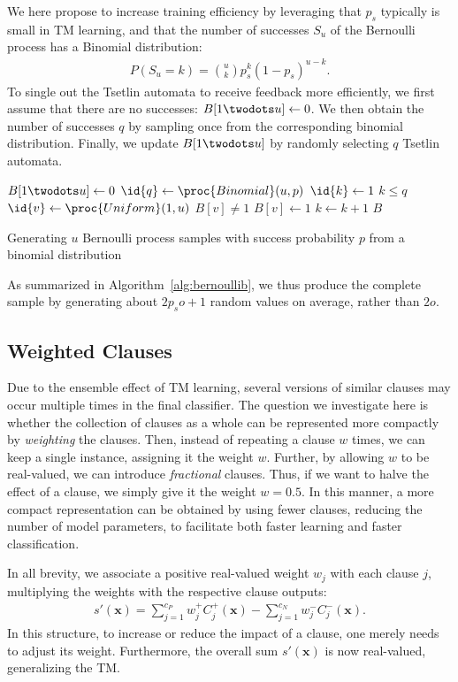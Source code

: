 \documentclass[letterpaper]{article}
\begin{document}
We here propose to increase training efficiency by leveraging that $p_s$ typically is small in TM learning, and that the number of successes $S_u$ of the Bernoulli process has a Binomial distribution:
\begin{align}
P(S_u=k)=\binom u k p_s^k(1-p_s)^{u-k}.
\end{align}
To single out the Tsetlin automata to receive feedback more efficiently, we first assume that there are no successes: $B[1\twodots u] \gets 0$. We then  obtain the number of successes $q$ by sampling once from the corresponding binomial distribution. Finally, we update $B[1\twodots u]$ by randomly selecting $q$ Tsetlin automata.
\begin{algorithm}[ht]
\begin{algorithmbox}
\li $B[1\twodots u] \gets 0$
\li $\id{q} \gets \proc{Binomial}(u,p)$
\li $\id{k} \gets 1$
\li \While $k \le q$
\li \Do
	$\id{v} \gets \proc{Uniform}(1,u)$
\li	\If $B[v] \neq 1$
\li	\Do
		$B[v] \gets 1$
\li		$k \gets k + 1$
	\End
  \End
\li \Return $B$
\end{algorithmbox}
\caption{Generating $u$ Bernoulli process samples with success probability $p$ from a binomial distribution}
\label{alg:bernoullib}
\end{algorithm}
As summarized in Algorithm~\ref{alg:bernoullib}, we thus produce the complete sample by generating about $2p_so+1$ random values on average, rather than $2o$.

\subsection{Weighted Clauses}
Due to the ensemble effect of TM learning, several versions of similar clauses may occur multiple times in the final classifier. The question we investigate here is whether the collection of clauses as a whole can be represented more compactly by \emph{weighting} the clauses. Then, instead of repeating a clause $w$ times, we can keep a single instance, assigning it the weight $w$. Further, by allowing $w$ to be real-valued, we can introduce \emph{fractional} clauses. Thus, if we want to halve the effect of a clause, we simply give it the weight $w=0.5$. In this manner, a more compact representation can be obtained by using fewer clauses, reducing the number of model parameters, to facilitate both faster learning and faster classification. 

In all brevity, we associate a positive real-valued weight $w_j$ with each clause $j$, multiplying the weights with the respective clause outputs: \begin{align}
s'(\mathbf x)=\sum_{j=1}^{c_P}w^+_j C^+_j(\mathbf x)-\sum_{j=1}^{c_N}w^-_jC^-_j(\mathbf x).
\end{align}
In this structure, to increase or reduce the impact of a clause, one merely needs to adjust its weight. Furthermore, the overall sum $s'(\mathbf x)$ is now real-valued, generalizing the TM.
\end{document}

